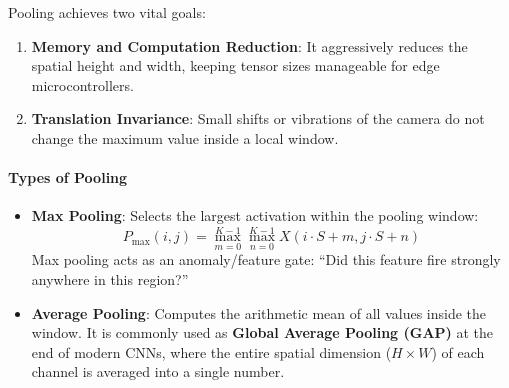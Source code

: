 Pooling achieves two vital goals:
\begin{enumerate}
    \item \textbf{Memory and Computation Reduction}: It aggressively reduces the spatial height and width, keeping tensor sizes manageable for edge microcontrollers.
    \item \textbf{Translation Invariance}: Small shifts or vibrations of the camera do not change the maximum value inside a local window.
\end{enumerate}

\paragraph{Types of Pooling}
\begin{itemize}
    \item \textbf{Max Pooling}: Selects the largest activation within the pooling window:
    \begin{equation}
    P_{\text{max}}(i, j) = \max_{m=0}^{K-1} \max_{n=0}^{K-1} X(i \cdot S + m, j \cdot S + n)\label{eq:maxpool}
    \end{equation}
    Max pooling acts as an anomaly/feature gate: ``Did this feature fire strongly anywhere in this region?''
    \item \textbf{Average Pooling}: Computes the arithmetic mean of all values inside the window. It is commonly used as \textbf{Global Average Pooling (GAP)} at the end of modern CNNs, where the entire spatial dimension ($H \times W$) of each channel is averaged into a single number.
\end{itemize}

